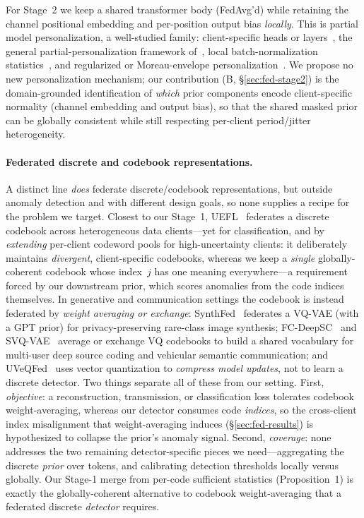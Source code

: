 \documentclass[11pt]{article}
\theoremstyle{plain}
\theoremstyle{definition}
\begin{document}
For Stage~2 we keep a shared transformer body (FedAvg'd) while retaining the channel
positional embedding and per-position output bias \emph{locally}. This is partial
model personalization, a well-studied family: client-specific heads or
layers~\cite{arivazhagan2019fedper,collins2021fedrep}, the general
partial-personalization framework of~\cite{pillutla2022partial}, local
batch-normalization statistics~\cite{li2021fedbn}, and regularized or
Moreau-envelope personalization~\cite{li2021ditto,dinh2020pfedme}. We propose no new
personalization mechanism; our contribution (B, \S\ref{sec:fed-stage2}) is the
domain-grounded identification of \emph{which} prior components encode client-specific
normality (channel embedding and output bias), so that the shared masked prior can
be globally consistent while still respecting per-client period/jitter heterogeneity.

\paragraph{Federated discrete and codebook representations.}
A distinct line \emph{does} federate discrete/codebook representations, but outside
anomaly detection and with different design goals, so none supplies a recipe for the
problem we target. Closest to our Stage~1, UEFL~\cite{zhang2024uefl} federates a
discrete codebook across heterogeneous data clients---yet for classification, and by
\emph{extending} per-client codeword pools for high-uncertainty clients: it deliberately
maintains \emph{divergent}, client-specific codebooks, whereas we keep a \emph{single}
globally-coherent codebook whose index~$j$ has one meaning everywhere---a requirement
forced by our downstream prior, which scores anomalies from the code indices
themselves. In generative and communication settings the codebook is instead
federated by \emph{weight averaging or exchange}: SynthFed~\cite{jiang2026synthfed}
federates a VQ-VAE (with a GPT prior) for privacy-preserving rare-class image
synthesis; FC-DeepSC~\cite{park2022fcdeepsc} and SVQ-VAE~\cite{jin2025svqvae} average
or exchange VQ codebooks to build a shared vocabulary for multi-user deep source
coding and vehicular semantic communication; and UVeQFed~\cite{shlezinger2021uveqfed}
uses vector quantization to \emph{compress model updates}, not to learn a discrete
detector. Two things separate all of these from our setting. First, \emph{objective}:
a reconstruction, transmission, or classification loss tolerates codebook
weight-averaging, whereas our detector consumes code \emph{indices}, so the
cross-client index misalignment that weight-averaging induces
(\S\ref{sec:fed-results}) is hypothesized to collapse the prior's
anomaly signal. Second, \emph{coverage}: none addresses the two remaining
detector-specific pieces we need---aggregating the discrete \emph{prior} over tokens,
and calibrating detection thresholds locally versus globally. Our Stage-1 merge from
per-code sufficient statistics (Proposition~1) is exactly the globally-coherent
alternative to codebook weight-averaging that a federated discrete \emph{detector}
requires.
\end{document}
